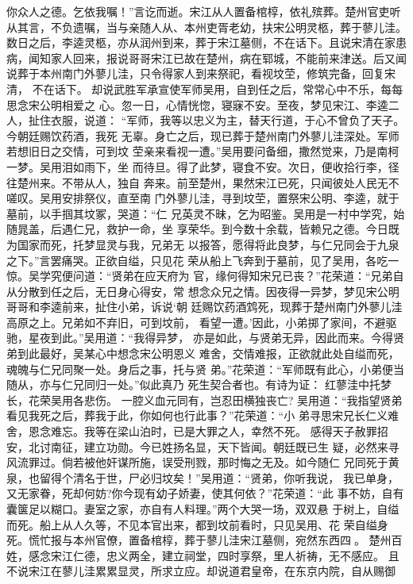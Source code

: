 你众人之德。乞依我嘱！”言讫而逝。宋江从人置备棺椁，依礼殡葬。楚州官吏听
从其言，不负遗嘱，当与亲随人从、本州吏胥老幼，扶宋公明灵柩，葬于蓼儿洼。
数日之后，李逵灵柩，亦从润州到来，葬于宋江墓侧，不在话下。且说宋清在家患
病，闻知家人回来，报说哥哥宋江已故在楚州，病在郓城，不能前来津送。后又闻
说葬于本州南门外蓼儿洼，只令得家人到来祭祀，看视坟茔，修筑完备，回复宋清，
不在话下。
却说武胜军承宣使军师吴用，自到任之后，常常心中不乐，每每思念宋公明相爱之
心。忽一日，心情恍惚，寝寐不安。至夜，梦见宋江、李逵二人，扯住衣服，说道：
“军师，我等以忠义为主，替天行道，于心不曾负了天子。今朝廷赐饮药酒，我死
无辜。身亡之后，现已葬于楚州南门外蓼儿洼深处。军师若想旧日之交情，可到坟
茔亲来看视一遭。”吴用要问备细，撒然觉来，乃是南柯一梦。吴用泪如雨下，坐
而待旦。得了此梦，寝食不安。次日，便收拾行李，径往楚州来。不带从人，独自
奔来。前至楚州，果然宋江已死，只闻彼处人民无不嗟叹。吴用安排祭仪，直至南
门外蓼儿洼，寻到坟茔，置祭宋公明、李逵，就于墓前，以手掴其坟冢，哭道：“仁
兄英灵不昧，乞为昭鉴。吴用是一村中学究，始随晁盖，后遇仁兄，救护一命，坐
享荣华。到今数十余载，皆赖兄之德。今日既为国家而死，托梦显灵与我，兄弟无
以报答，愿得将此良梦，与仁兄同会于九泉之下。”言罢痛哭。正欲自缢，只见花
荣从船上飞奔到于墓前，见了吴用，各吃一惊。吴学究便问道：“贤弟在应天府为
官，缘何得知宋兄已丧？”花荣道：“兄弟自从分散到任之后，无日身心得安，常
想念众兄之情。因夜得一异梦，梦见宋公明哥哥和李逵前来，扯住小弟，诉说‘朝
廷赐饮药酒鸩死，现葬于楚州南门外蓼儿洼高原之上。兄弟如不弃旧，可到坟前，
看望一遭。’因此，小弟掷了家间，不避驱驰，星夜到此。”吴用道：“我得异梦，
亦是如此，与贤弟无异，因此而来。今得贤弟到此最好，吴某心中想念宋公明恩义
难舍，交情难报，正欲就此处自缢而死，魂魄与仁兄同聚一处。身后之事，托与贤
弟。”花荣道：“军师既有此心，小弟便当随从，亦与仁兄同归一处。”似此真乃
死生契合者也。有诗为证：
红蓼洼中托梦长，花荣吴用各悲伤。
一腔义血元同有，岂忍田横独丧亡?
吴用道：“我指望贤弟看见我死之后，葬我于此，你如何也行此事？”花荣道：“小
弟寻思宋兄长仁义难舍，恩念难忘。我等在梁山泊时，已是大罪之人，幸然不死。
感得天子赦罪招安，北讨南征，建立功勋。今已姓扬名显，天下皆闻。朝廷既已生
疑，必然来寻风流罪过。倘若被他奸谋所施，误受刑戮，那时悔之无及。如今随仁
兄同死于黄泉，也留得个清名于世，尸必归坟矣！”吴用道：“贤弟，你听我说，
我已单身，又无家眷，死却何妨?你今现有幼子娇妻，使其何依？”花荣道：“此
事不妨，自有囊箧足以糊口。妻室之家，亦自有人料理。”两个大哭一场，双双悬
于树上，自缢而死。船上从人久等，不见本官出来，都到坟前看时，只见吴用、花
荣自缢身死。慌忙报与本州官僚，置备棺椁，葬于蓼儿洼宋江墓侧，宛然东西四。
楚州百姓，感念宋江仁德，忠义两全，建立祠堂，四时享祭，里人祈祷，无不感应。
且不说宋江在蓼儿洼累累显灵，所求立应。却说道君皇帝，在东京内院，自从赐御
